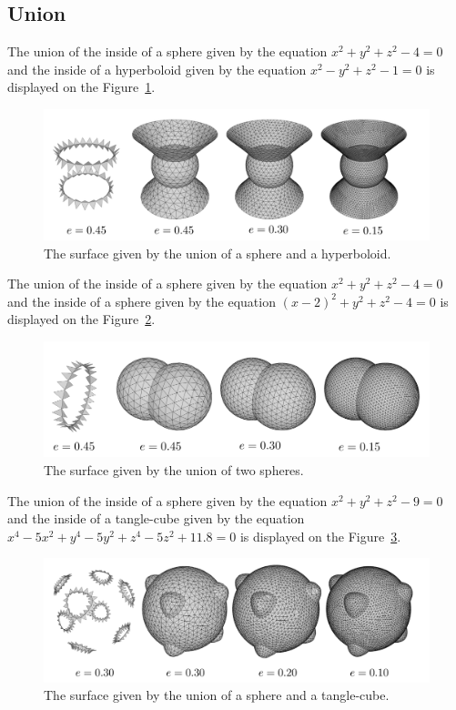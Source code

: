\subsection{Union}
The union of the inside of a sphere given by the equation
$x^2+y^2+z^2-4=0$ and the inside of a hyperboloid given by the 
equation $x^2-y^2+z^2-1=0$ is displayed on the Figure~\ref{img:77}.
\begin{figure}[h!]
    \centerline{\includegraphics[scale=0.5]{images/img77}}
    \caption[The surface given by the union of a sphere and a hyperboloid]
    {The surface given by the union of a sphere and a hyperboloid.}
    \label{img:77}
\end{figure}
The union of the inside of a sphere given by the equation
$x^2+y^2+z^2-4=0$ and the inside of a sphere given by the 
equation $(x-2)^2+y^2+z^2-4=0$ is displayed on the Figure~\ref{img:78}.
\begin{figure}[h!]
    \centerline{\includegraphics[scale=0.5]{images/img78}}
    \caption[The surface given by the union of two spheres]
    {The surface given by the union of two spheres.}
    \label{img:78}
\end{figure}
The union of the inside of a sphere given by the equation
$x^2+y^2+z^2-9=0$ and the inside of a tangle-cube given by the 
equation $x^4-5x^2+y^4-5y^2+z^4-5z^2+11.8=0$ is displayed on the Figure~\ref{img:79}.
\begin{figure}[h!]
    \centerline{\includegraphics[scale=0.5]{images/img79}}
    \caption[The surface given by the union of a sphere and a tangle-cube]
    {The surface given by the union of a sphere and a tangle-cube.}
    \label{img:79}
\end{figure}

